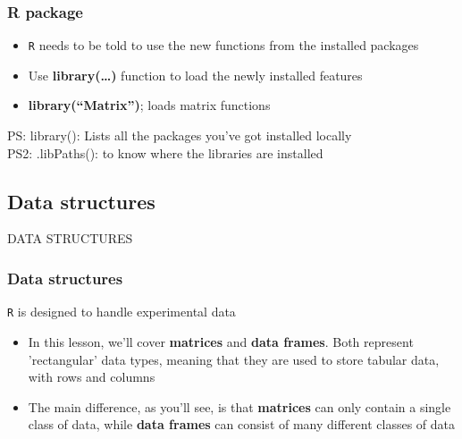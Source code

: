 \documentclass{beamer}
\begin{document}
\begin{frame}[fragile]
	\frametitle{R package}
	\begin{itemize}
	\small
		\item \texttt{R} needs to be told to use the new functions from the installed packages 
		\item Use \textbf{library(\ldots)} function to load the newly installed features
		\item \textbf{library(``Matrix'')};  loads matrix functions
	\end{itemize}
	\footnotesize PS: library(): Lists all the packages you've got installed locally\\
	PS2: .libPaths(): to know where the libraries are installed
\end{frame}


\subsection{Data structures}
\begin{frame}
	\centering \Large {\sc DATA STRUCTURES}
\end{frame}


\begin{frame}[fragile]
	\frametitle{Data structures}
	\centering \LARGE \texttt{R} is designed to handle experimental data
	\begin{itemize}
		\small
		\item In this lesson, we'll cover \textbf{matrices} and \textbf{data frames}. Both represent 'rectangular' data types, meaning that they are used to store tabular data, with rows and columns
		\item The main difference, as you'll see, is that \textbf{matrices} can only contain a single class of data, while \textbf{data frames} can consist of many different classes of data
	\end{itemize}
\end{frame}
\end{document}
